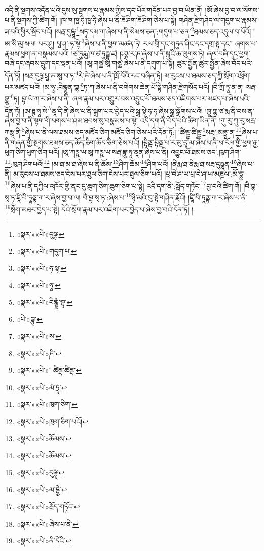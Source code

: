 འདི་ནི་སྔགས་འདོན་པའི་དུས་སུ་སྔགས་པ་རྣམས་ཀྱིས་དང་པོར་གདོན་པར་བྱ་བ་ཡིན་ནོ། །ཨོཾ་ཞེས་བྱ་བ་ལ་སོགས་པ་ནི་སྔགས་ཀྱི་ཚིག་གོ། །ཁ་ཁ་ཁཱ་ཧི་ཁཱ་ཧི་ཞེས་པ་ནི་ཟོ་ཤིག་ཟོ་ཤིག་ཅེས་པ་སྟེ། གཤིན་རྗེ་གཤེད་ལ་གདུག་པ་རྣམས་ཟ་བའི་ཕྱིར་སྦོད་པའོ། །སརྦ་དུཥྚཱཾ་\footnote{«སྣར་»«པེ་»དུཥྚ་}སཏྭ་དམ་ཀ་ཞེས་པ་ནི་སེམས་ཅན་:གདུག་པ་ཅན་\footnote{«སྣར་»«པེ་»གདུག་པ་}ཐམས་ཅད་འདུལ་བ་པོའོ། །ཨ་སི་མུ་སལ། པར་ཤུ། པཱ་ཤ་:ཧ་སྟེ་\footnote{«སྣར་»«པེ་»ཧ་སྟ་}ཞེས་པ་ནི་ཕྱག་མཚན་ཏེ། རལ་གྲི་དང་གཏུན་ཤིང་དང་དགྲ་སྟ་དང་། ཞགས་པ་རྣམས་ཕྱག་ན་བསྣམས་པའོ། །ཙ་ཏུརྨུ་ཁ་ཙ་ཏུརྦྷུ་ཛ། ཥཊྩ་ར་ཎ་ཞེས་པ་ནི་སྐུའི་ཆ་ལུགས་ཏེ། ཞལ་བཞི་དང་ཕྱག་བཞི་དང་ཞབས་དྲུག་དང་ལྡན་པའོ། །ཨཱ་གཙྪ་ཨཱ་གཙྪ་ཞེས་པ་ནི་དགུག་པ་སྟེ། ཚུར་སྤྱོན་ཚུར་སྤྱོན་ཞེས་བོད་པའི་དོན་ཏོ། །སརྦ་དུཥྚ་པྲཱ་ཎ་ཨཱ་བ་ཧ་\footnote{«སྣར་»«པེ་»ཧཱ་}རེ་ཎེ་ཞེས་པ་ནི་ཁྲོ་བོའི་རང་བཞིན་ཏེ། མ་རུངས་པ་ཐམས་ཅད་ཀྱི་སྲོག་འཕྲོག་པར་མཛད་པའོ། །མ་ཧཱ་:བིགྷྣཱན་གྷ་\footnote{«སྣར་»«པེ་»བིགྷྷྣཾ་གྷཱ་}ཏ་ཀ་ཞེས་པ་ནི་བགེགས་ཆེན་པོ་སྟེ་གཤིན་རྗེ་གསོད་པའོ། །བི་ཀྲྀ་ཏཱ་ན་ན། སརྦ་བྷཱུ་\footnote{«པེ་»བྷུ་}ཏ། བྷ་ཡཾ་ཀ་ར་ཞེས་པ་ནི། ཞལ་རྣམ་པར་འགྱུར་བས་འབྱུང་པོ་ཐམས་ཅད་འཇིགས་པར་མཛད་པ་ཞེས་པའི་དོན་ཏོ། །ཨ་ཊྚ་ཧཱ་སེ་\footnote{«སྣར་»«པེ་»ས་}ནཱ་དི་ནེ་ཞེས་པ་ནི་སྐྲག་པར་བྱེད་པའི་སྒྲ་སྟེ་ཧ་ཧ་ཞེས་སྒྲ་སྒྲོགས་པའོ། །བྱཱ་གྷྲ་ཙ་རྨ་ནི་བས་ན་ཞེས་བྱ་བ་ནི་སྟག་གི་པགས་པ་ཤམ་ཐབས་སུ་བསྣམས་པ་སྟེ། འདི་དག་ནི་བོད་པའི་ཚིག་ཡིན་ནོ། །ཀུ་རུ་ཀུ་རུ་སརྦ་ཀརྨཱ་ནི་\footnote{«སྣར་»«པེ་»ཎི་}ཞེས་པ་ནི་ལས་ཐམས་ཅད་མཛོད་ཅིག་མཛོད་ཅིག་ཅེས་པའི་དོན་ཏོ:། །ཚིནྡྷ་ཚིནྡྷ་\footnote{«སྣར་»«པེ་»། ཚིནྡ་ཚིནྡ་}སརྦ་:མནྟྲཱ་ན་\footnote{«སྣར་»«པེ་»མཾ་ཏྲཱཾ་}ཞེས་པ་ནི་གཞན་གྱི་སྔགས་ཐམས་ཅད་ཆོད་ཅིག་ཆོད་ཅིག་ཅེས་པའོ། །བྷིནྡ་བྷིནྡ་པ་ར་མུ་དྲཱ་མ་ཞེས་པ་ནི་ཕ་རོལ་གྱི་ཕྱག་རྒྱ་ཕུག་ཅིག་ཕུག་ཅིག་པའོ། །ཨཱ་ཀཪྵ་ཡ་ཨཱ་ཀཪྵ་ཡ་སརྦ་བྷཱུ་ཏཱ་ནཱན་ཞེས་པ་ནི། འབྱུང་པོ་ཐམས་ཅད་:ཁུག་ཤིག་\footnote{«སྣར་»«པེ་»ཁུག་ཅིག་}:ཁུག་ཤིགཔའོ།\footnote{«སྣར་»«པེ་»ཁུག་ཅིག་པའོ།} །མ་ཐ་མ་ཐ་ཞེས་པ་ནི་ཆོམ་\footnote{«སྣར་»«པེ་»ཆོམས་}ཤིག་ཆོམ་\footnote{«སྣར་»«པེ་»ཆོམས་}ཤིག་པའོ། །ནིརྨ་ཐ་ནིརྨ་ཐ་སརྦ་དུཥྚཱན་\footnote{«སྣར་»«པེ་»དུཥྚཱཾ་}ཞེས་པ་ནི། མ་རུངས་པ་ཐམས་ཅད་ངེས་པར་ཐུལ་ཅིག་ངེས་པར་ཐུལ་ཅིག་པའོ། །པྲ་བེ་ཤ་ཡ་པྲ་བེ་ཤ་ཡ་མཎྜལ་:མོ་དྷྱ་\footnote{«སྣར་»«པེ་»མ་དྷྱེ་}ཞེས་པ་ནི་དཀྱིལ་འཁོར་གྱི་ནང་དུ་ཆུག་ཅིག་ཆུག་ཅིག་པ་སྟེ། འདི་དག་ནི་:སྦོད་གཏོང་\footnote{«སྣར་»«པེ་»རྦོད་གཏོང་}བྱ་བའི་ཚིག་གོ། །བཻ་བྷ་སྭ་ཏ་ཛཱི་བི་ཏཱནྟ་ཀ་ར་ཞེས་བྱ་བ་ལ། བཻ་བྷ་སྭ་ཏ་:ཞེས་པ་\footnote{«སྣར་»«པེ་»ཞེས་པ་ནི་}ཉི་མའི་བུ་སྟེ་གཤིན་རྗེའོ། །ཛཱི་བི་ཏཱནྟ་ཀ་ར་ཞེས་པ་ནི་\footnote{«སྣར་»«པེ་»ནི་དེའི་}སྲོག་མཐར་བྱེད་པ་སྟེ། དེའི་སྲོག་རྣམ་པར་འཇིག་པར་བྱེད་པ་ཞེས་བྱ་བའི་དོན་ཏོ། །
